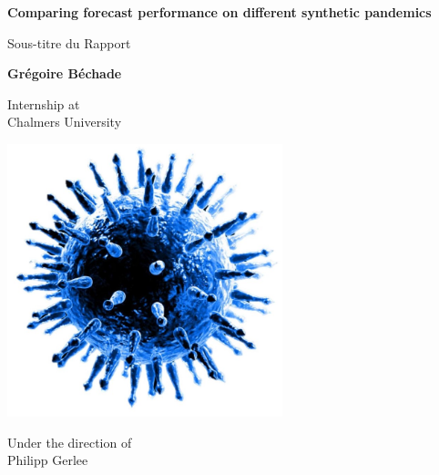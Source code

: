 \documentclass[12pt,a4paper]{report}
\begin{document}
\begin{titlepage}
    \begin{center}
        \vspace*{1cm}
        
        \Huge
        \textbf{Comparing forecast performance on different synthetic pandemics }
        
        \vspace{0.5cm}
        \LARGE
        Sous-titre du Rapport
        
        \vspace{1.5cm}
        
        \textbf{Grégoire Béchade}
        
        \vfill
        
        \Large
        Internship at  \\
        Chalmers University
        
        \vspace{0.8cm}
        
        \includegraphics[width=0.6\textwidth]{figures/le virus_découpé_bis.jpg}
        
        \vfill
        
        \Large
        Under the direction of \\
        Philipp Gerlee
        
        \vspace{0.8cm}
       
        
    \end{center}
\end{titlepage}

\newpage
\thispagestyle{empty}
\mbox{}
\newpage

\tableofcontents
\newpage


 




\printbibliography %
\end{document}
